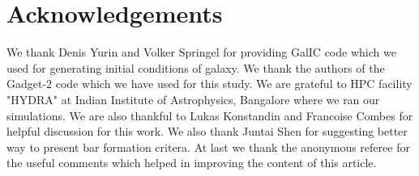 \documentclass[a4paper,fleqn,usenatbib,useAMS]{mnras}
\begin{document}
\section*{Acknowledgements}

We thank Denis Yurin and Volker Springel for providing GalIC code which we used for generating initial conditions of galaxy. We thank the authors of the Gadget-2 code \citep{56,61} which we have  used for this study. We are grateful to HPC facility "HYDRA" at Indian Institute of Astrophysics, Bangalore where we ran our simulations. We are also thankful to Lukas Konstandin and Francoise Combes for helpful discussion for this work. We also thank Juntai Shen for suggesting better way to present bar formation critera. At last we thank the anonymous referee for the useful comments which helped in improving the content of this article.





%
\end{document}
